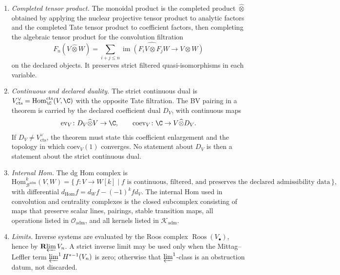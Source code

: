 \begin{defn}
\begin{enumerate}[label=\textup{(A\arabic*)}]
      separated; differentials are strict continuous maps; cones and
      shifts carry the completed induced filtration.
    \item \emph{Completed tensor product.}  The monoidal product is the
      completed product \(\widehat\otimes\) obtained by applying the
      nuclear projective tensor product to analytic factors and the
      completed Tate tensor product to coefficient factors, then
      completing the algebraic tensor product for the convolution
      filtration
      \[
        F_n(V\widehat\otimes W)=
        \widehat{\sum_{i+j\leq n}\operatorname{im}
        (F_iV\otimes F_jW\to V\otimes W)}
      \]
      on the declared objects.  It preserves strict filtered
      quasi-isomorphisms in each variable.
    \item \emph{Continuous and declared duality.}  The strict continuous
      dual is
      \(V^\vee_{\mathrm{cts}}=\operatorname{Hom}^{\mathrm{cts}}_\C(V,\C)\)
      with the opposite Tate filtration.  The BV pairing in a theorem is
      carried by the declared coefficient dual \(D_V\), with continuous
      maps
      \[
        \mathrm{ev}_V\colon D_V\widehat\otimes V\to\C,\qquad
        \mathrm{coev}_V\colon \C\to V\widehat\otimes D_V .
      \]
      If \(D_V\ne V^\vee_{\mathrm{cts}}\), the theorem must state this
      coefficient enlargement and the topology in which
      \(\mathrm{coev}_V(1)\) converges.  No statement about \(D_V\) is
      then a statement about the strict continuous dual.
    \item \emph{Internal Hom.}  The dg Hom complex is
      \[
        \underline{\mathrm{Hom}}^k_{\mathcal B^{\mathrm{adm}}}(V,W)
        =
        \{\,f\colon V\to W[k]\mid f
        \text{ is continuous, filtered, and preserves the declared
        admissibility data}\,\},
      \]
      with differential
      \(d_{\mathrm{Hom}}f=d_W f-(-1)^k f d_V\).  The internal Hom
      used in convolution and centrality complexes is the closed
      subcomplex consisting of maps that preserve scalar lines, pairings,
      stable transition maps, all operations listed in
      \(\mathcal O_{\mathrm{adm}}\), and all kernels listed in
      \(\mathcal K_{\mathrm{adm}}\).
    \item \emph{Limits.}  Inverse systems are evaluated by the Roos
      complex \(\operatorname{Roos}(V_\bullet)\), hence by
      \(\mathbf R\!\varprojlim V_n\).  A strict inverse limit may be used
      only when the Mittag--Leffler term
      \(\varprojlim\nolimits^1 H^{*-1}(V_n)\) is zero; otherwise that
      \(\varprojlim^1\)-class is an obstruction datum, not discarded.

\end{enumerate}
\end{defn}
